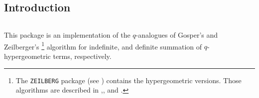
{\setcounter{redprompt}{0}}
\newcommand{\redprompt}{\stepcounter{redprompt}\theredprompt:}
\newenvironment{redoutput}{\small\begin{alltt}}{\end{alltt}\vskip-\parskip\noindent{}}


\subsection{Introduction}

\ifdefined\VerbMath
\(
\newcommand{\qphihyp}[5]{{}_{#1}\phi_{#2}\left.\left[\begin{array}{c}
	#3 \\ #4 \end{array}\right|q,#5\right]}
\newcommand{\qpsihyp}[5]{{}_{#1}\psi_{#2}\left.\left[\begin{array}{c}
	#3 \\ #4 \end{array}\right|q,#5\right]}
\newcommand{\hyp}[5]{{}_{#1}F_{#2}\left.\left[\begin{array}{c}
	#3 \\ #4 \end{array}\right|#5\right]}
%
\newcommand{\fcn}[2]{{\mathrm #1}(#2)}
\newcommand{\ifcn}[3]{{\mathrm #1}_{#2}(#3)}
\newcommand{\qfac}[2]{\left(#1;\,q\right)_{#2}}
\newcommand{\qbinomial}[2]{{\binom{#1}{#2}\!}_q}
\)%
\else
\newcommand{\qphihyp}[5]{{}_{#1}\phi_{#2}\left.\left[\begin{array}{c}
	#3 \\ #4 \end{array}\right|q,#5\right]}
\newcommand{\qpsihyp}[5]{{}_{#1}\psi_{#2}\left.\left[\begin{array}{c}
	#3 \\ #4 \end{array}\right|q,#5\right]}
\newcommand{\hyp}[5]{{}_{#1}F_{#2}\left.\left[\begin{array}{c}
	#3 \\ #4 \end{array}\right|#5\right]}

\newcommand{\fcn}[2]{{\mathrm #1}(#2)}
\newcommand{\ifcn}[3]{{\mathrm #1}_{#2}(#3)}
\newcommand{\qfac}[2]{\left(#1;\,q\right)_{#2}}
\newcommand{\qbinomial}[2]{{\binom{#1}{#2}\!}_q}
\fi
This package is an implementation of the $q$-analogues of Gosper's
and Zeil\-berger's%
%
\footnote{The \texttt{ZEILBERG} package (see \cite{Koepf:95})
contains the hypergeometric versions. Those algorithms are described in
\cite{Gosper:78},\cite{Zeilberger:91},\cite{Zeilberger:90}
and \cite{Koepf:95e}.}
%
algorithm for indefinite, and definite summation of
$q$-hypergeo\-metric terms, respectively.

